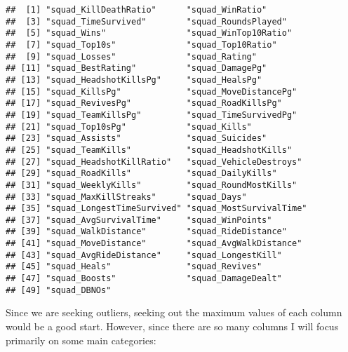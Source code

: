 \documentclass[]{article}
\begin{document}
\begin{verbatim}
##  [1] "squad_KillDeathRatio"      "squad_WinRatio"           
##  [3] "squad_TimeSurvived"        "squad_RoundsPlayed"       
##  [5] "squad_Wins"                "squad_WinTop10Ratio"      
##  [7] "squad_Top10s"              "squad_Top10Ratio"         
##  [9] "squad_Losses"              "squad_Rating"             
## [11] "squad_BestRating"          "squad_DamagePg"           
## [13] "squad_HeadshotKillsPg"     "squad_HealsPg"            
## [15] "squad_KillsPg"             "squad_MoveDistancePg"     
## [17] "squad_RevivesPg"           "squad_RoadKillsPg"        
## [19] "squad_TeamKillsPg"         "squad_TimeSurvivedPg"     
## [21] "squad_Top10sPg"            "squad_Kills"              
## [23] "squad_Assists"             "squad_Suicides"           
## [25] "squad_TeamKills"           "squad_HeadshotKills"      
## [27] "squad_HeadshotKillRatio"   "squad_VehicleDestroys"    
## [29] "squad_RoadKills"           "squad_DailyKills"         
## [31] "squad_WeeklyKills"         "squad_RoundMostKills"     
## [33] "squad_MaxKillStreaks"      "squad_Days"               
## [35] "squad_LongestTimeSurvived" "squad_MostSurvivalTime"   
## [37] "squad_AvgSurvivalTime"     "squad_WinPoints"          
## [39] "squad_WalkDistance"        "squad_RideDistance"       
## [41] "squad_MoveDistance"        "squad_AvgWalkDistance"    
## [43] "squad_AvgRideDistance"     "squad_LongestKill"        
## [45] "squad_Heals"               "squad_Revives"            
## [47] "squad_Boosts"              "squad_DamageDealt"        
## [49] "squad_DBNOs"
\end{verbatim}

Since we are seeking outliers, seeking out the maximum values of each
column would be a good start. However, since there are so many columns I
will focus primarily on some main categories:
\end{document}
